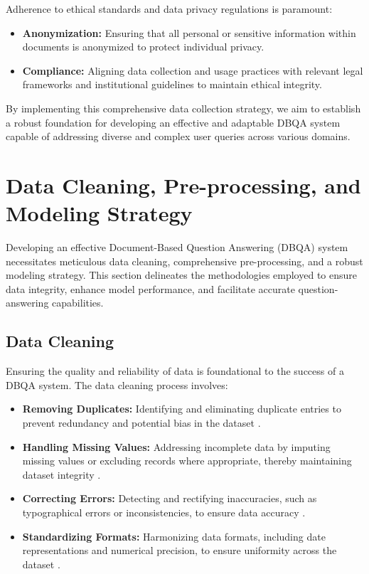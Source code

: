 \documentclass[sigconf]{acmart}
\begin{document}
Adherence to ethical standards and data privacy regulations is paramount:

\begin{itemize}
    \item \textbf{Anonymization:} Ensuring that all personal or sensitive information within documents is anonymized to protect individual privacy.
    \item \textbf{Compliance:} Aligning data collection and usage practices with relevant legal frameworks and institutional guidelines to maintain ethical integrity.
\end{itemize}

By implementing this comprehensive data collection strategy, we aim to establish a robust foundation for developing an effective and adaptable DBQA system capable of addressing diverse and complex user queries across various domains.

\section{Data Cleaning, Pre-processing, and Modeling Strategy}

Developing an effective Document-Based Question Answering (DBQA) system necessitates meticulous data cleaning, comprehensive pre-processing, and a robust modeling strategy. This section delineates the methodologies employed to ensure data integrity, enhance model performance, and facilitate accurate question-answering capabilities.

\subsection{Data Cleaning}

Ensuring the quality and reliability of data is foundational to the success of a DBQA system. The data cleaning process involves:

\begin{itemize}
    \item \textbf{Removing Duplicates:} Identifying and eliminating duplicate entries to prevent redundancy and potential bias in the dataset \cite{turn0search8}.
    \item \textbf{Handling Missing Values:} Addressing incomplete data by imputing missing values or excluding records where appropriate, thereby maintaining dataset integrity \cite{turn0search8}.
    \item \textbf{Correcting Errors:} Detecting and rectifying inaccuracies, such as typographical errors or inconsistencies, to ensure data accuracy \cite{turn0search8}.
    \item \textbf{Standardizing Formats:} Harmonizing data formats, including date representations and numerical precision, to ensure uniformity across the dataset \cite{turn0search8}.
\end{itemize}
\end{document}
